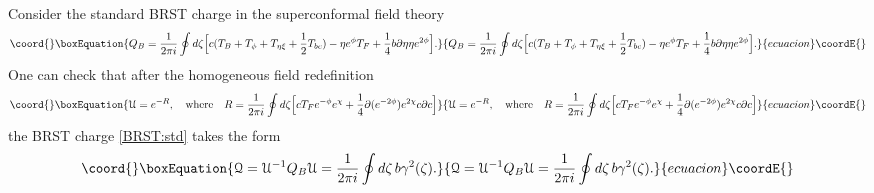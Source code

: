 \documentclass[a4paper,12pt]{article}
\providecommand{\Qc}{\mathcal{Q}}
\providecommand{\Uc}{\mathcal{U}}
\providecommand{\pd}{\partial}
\begin{document}
Consider the standard BRST charge in the
superconformal field theory
\begin{equation}\coord{}\boxEquation{
Q_B=\frac{1}{2\pi i}\oint d\zeta \Bigl[
c(T_B+T_{\phi}+T_{\eta\xi}+\frac{1}{2}T_{bc})
-\eta e^{\phi}T_F+\frac{1}{4}b\pd\eta\eta e^{2\phi}
\Bigr].
\label{BRST:std}
}{
Q_B=\frac{1}{2\pi i}\oint d\zeta \Bigl[
c(T_B+T_{\phi}+T_{\eta\xi}+\frac{1}{2}T_{bc})
-\eta e^{\phi}T_F+\frac{1}{4}b\pd\eta\eta e^{2\phi}
\Bigr].
}{ecuacion}\coordE{}\end{equation}
One can check that after the homogeneous field redefinition
\cite{9902178}
\begin{equation}\coord{}\boxEquation{
\Uc=e^{-R},\quad\text{where}\quad
R=\frac{1}{2\pi i}\oint d\zeta \Bigl[
cT_F e^{-\phi}e^{\chi}+\frac{1}{4}\pd(e^{-2\phi})e^{2\chi}c\pd c
\Bigr]\label{redef-1}
}{
\Uc=e^{-R},\quad\text{where}\quad
R=\frac{1}{2\pi i}\oint d\zeta \Bigl[
cT_F e^{-\phi}e^{\chi}+\frac{1}{4}\pd(e^{-2\phi})e^{2\chi}c\pd c
\Bigr]}{ecuacion}\coordE{}\end{equation}
the BRST charge \eqref{BRST:std} takes the form
\begin{equation}\coord{}\boxEquation{
\Qc=\Uc^{-1}Q_B\Uc=\frac{1}{2\pi i}\oint d\zeta\,
b\gamma^2(\zeta).\label{redef-2}
}{
\Qc=\Uc^{-1}Q_B\Uc=\frac{1}{2\pi i}\oint d\zeta\,
b\gamma^2(\zeta).}{ecuacion}\coordE{}\end{equation}
\end{document}
